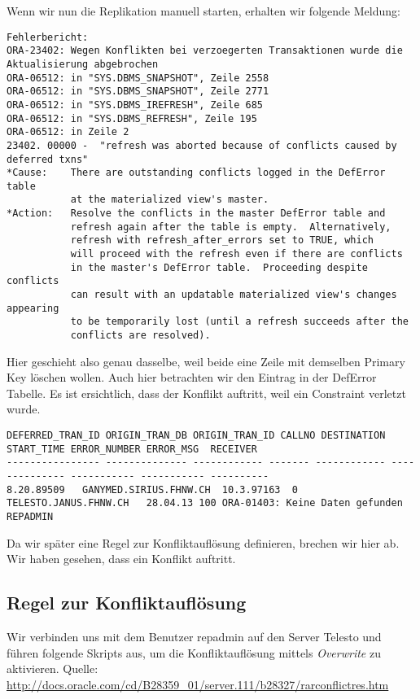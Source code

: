 \documentclass[11pt,a4paper,parskip=half]{scrartcl}
\begin{document}
Wenn wir nun die Replikation manuell starten, erhalten wir folgende Meldung:
\begin{lstlisting}
Fehlerbericht:
ORA-23402: Wegen Konflikten bei verzoegerten Transaktionen wurde die Aktualisierung abgebrochen
ORA-06512: in "SYS.DBMS_SNAPSHOT", Zeile 2558
ORA-06512: in "SYS.DBMS_SNAPSHOT", Zeile 2771
ORA-06512: in "SYS.DBMS_IREFRESH", Zeile 685
ORA-06512: in "SYS.DBMS_REFRESH", Zeile 195
ORA-06512: in Zeile 2
23402. 00000 -  "refresh was aborted because of conflicts caused by deferred txns"
*Cause:    There are outstanding conflicts logged in the DefError table
           at the materialized view's master.
*Action:   Resolve the conflicts in the master DefError table and
           refresh again after the table is empty.  Alternatively,
           refresh with refresh_after_errors set to TRUE, which
           will proceed with the refresh even if there are conflicts
           in the master's DefError table.  Proceeding despite conflicts
           can result with an updatable materialized view's changes appearing
           to be temporarily lost (until a refresh succeeds after the
           conflicts are resolved).
\end{lstlisting}

Hier geschieht also genau dasselbe, weil beide eine Zeile mit demselben Primary Key löschen wollen. Auch hier betrachten wir den Eintrag in der DefError Tabelle. Es ist ersichtlich, dass der Konflikt auftritt, weil ein Constraint verletzt wurde.
\begin{lstlisting}
DEFERRED_TRAN_ID ORIGIN_TRAN_DB ORIGIN_TRAN_ID CALLNO DESTINATION START_TIME ERROR_NUMBER ERROR_MSG  RECEIVER
---------------- -------------- ------------ ------- ------------ -------------- ----------- ----------- ----------
8.20.89509   GANYMED.SIRIUS.FHNW.CH  10.3.97163  0 TELESTO.JANUS.FHNW.CH   28.04.13 100 ORA-01403: Keine Daten gefunden  REPADMIN
\end{lstlisting}

Da wir später eine Regel zur Konfliktauflösung definieren, brechen wir hier ab. Wir haben gesehen, dass ein Konflikt auftritt.

\subsection{Regel zur Konfliktauflösung}
Wir verbinden uns mit dem Benutzer repadmin auf den Server Telesto und führen folgende Skripts aus, um die Konfliktauflösung mittels \emph{Overwrite} zu aktivieren. Quelle: \url{http://docs.oracle.com/cd/B28359_01/server.111/b28327/rarconflictres.htm}
\end{document}
